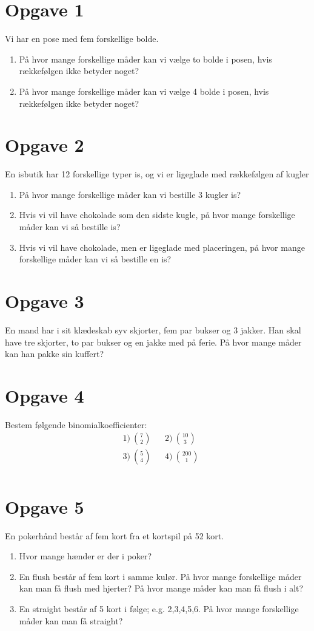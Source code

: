 \section*{Opgave 1}
Vi har en pose med fem forskellige bolde. 
\begin{enumerate}[label=\roman*)]
	\item På hvor mange forskellige måder kan vi vælge to bolde i posen, hvis rækkefølgen ikke betyder noget?
	\item På hvor mange forskellige måder kan vi vælge 4 bolde i posen, hvis rækkefølgen ikke betyder noget?
\end{enumerate}

\section*{Opgave 2}
En isbutik har 12 forskellige typer is, og vi er ligeglade med rækkefølgen af kugler
\begin{enumerate}[label=\roman*)]
	\item På hvor mange forskellige måder kan vi bestille 3 kugler is?
	\item Hvis vi vil have chokolade som den sidste kugle, på hvor mange forskellige måder kan vi så bestille is?
	\item Hvis vi vil have chokolade, men er ligeglade med placeringen, på hvor mange forskellige måder kan vi så
	 bestille en is?
\end{enumerate}



\section*{Opgave 3}
En mand har i sit klædeskab syv skjorter, fem par bukser og 3 jakker. Han skal have tre skjorter, to par bukser og en jakke med på ferie. På hvor mange måder kan han pakke sin kuffert?

\section*{Opgave 4}
Bestem følgende binomialkoefficienter:
\begin{align*}
&1) \ \binom{7}{2}  &&2) \ \binom{10}{3}  \\
&3) \ \binom{5}{4}  &&4) \ \binom{200}{1}   \\
\end{align*}

\section*{Opgave 5}
En pokerhånd består af fem kort fra et kortspil på 52 kort.
\begin{enumerate}[label=\roman*)]
\item Hvor mange hænder er der i poker?
\item En flush består af fem kort i samme kulør. På hvor mange forskellige måder kan man få flush med hjerter? På hvor mange måder kan man få flush i alt?
\item En straight består af 5 kort i følge; e.g. 2,3,4,5,6. På hvor mange forskellige måder kan man få straight?
\end{enumerate} 

